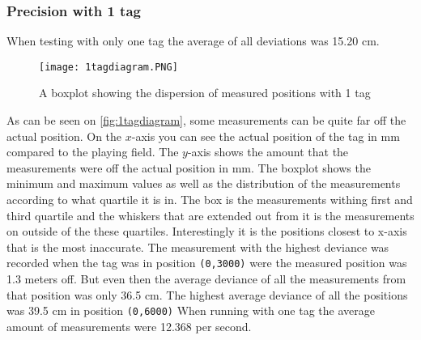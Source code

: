 \subsubsection{Precision with 1 tag} 
When testing with only one tag the average of all deviations was 15.20 cm.
\begin{figure}[H]
    \centering
    \texttt{[image: 1tagdiagram.PNG]}
    \caption{A boxplot showing the dispersion of measured positions with 1 tag}
    \label{fig:1tagdiagram}
\end{figure}
\noindent
As can be seen on \autoref{fig:1tagdiagram}, some measurements can be quite far off the actual position. 
On the $x$-axis you can see the actual position of the tag in mm compared to the playing field.
The $y$-axis shows the amount that the measurements were off the actual position in mm.
The boxplot shows the minimum and maximum values as well as the distribution of the measurements according to what quartile it is in.
The box is the measurements withing first and third quartile and the whiskers that are extended out from it is the measurements on outside of the these quartiles.
Interestingly it is the positions closest to x-axis that is the most inaccurate.
The measurement with the highest deviance was recorded when the tag was in position \texttt{(0,3000)} were the measured position was 1.3 meters off.
But even then the average deviance of all the measurements from that position was only 36.5 cm.
The highest average deviance of all the positions was 39.5 cm in position \texttt{(0,6000)}
When running with one tag the average amount of measurements were 12.368 per second.
 


